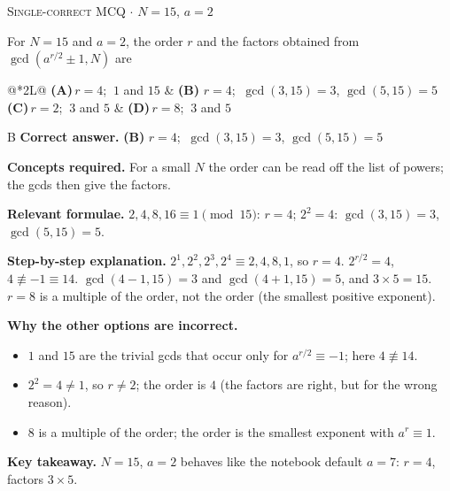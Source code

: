 \documentclass[11pt,a4paper]{article}
\newcommand{\optlabel}[1]{\textbf{(#1)}}
\newcommand{\correctlabel}[1]{\textcolor{okgreen}{\textbf{(#1)}\,\ding{51}}}
\newenvironment{qitem}[1]{\begin{list}{}{\setlength{\leftmargin}{3.3em}\setlength{\labelwidth}{3.1em}%
  \setlength{\labelsep}{0.2em}\setlength{\topsep}{3pt}\setlength{\parsep}{3pt}}\item[\textbf{Q.#1}\hfill]}{\end{list}}
\newcommand{\qsep}{\par\vspace{2pt}{\color{black!15}\hrule}\vspace{4pt}}
\newcommand{\qmeta}[2]{{\footnotesize\color{black!60}\textsc{#1} \;$\cdot$\; #2}\par}
\begin{document}
\begin{qitem}{42}
\qmeta{Single-correct MCQ}{$N = 15$, $a = 2$}
For $N = 15$ and $a = 2$, the order $r$ and the factors obtained from $\gcd(a^{r/2} \pm 1, N)$ are
\par\smallskip\noindent\begin{tabularx}{\linewidth}{@{}*{2}{L}@{}}
\optlabel{A}\,$r = 4$; $\ 1$ and $15$ & \correctlabel{B}\,$r = 4$; $\ \gcd(3, 15) = 3$, $\gcd(5, 15) = 5$ \\[3pt]
\optlabel{C}\,$r = 2$; $\ 3$ and $5$ & \optlabel{D}\,$r = 8$; $\ 3$ and $5$
\end{tabularx}
\end{qitem}
\begin{solbox}{B}
\textbf{\color{brand}Correct answer.} \textcolor{okgreen}{\textbf{(B)}} $r = 4$; $\ \gcd(3, 15) = 3$, $\gcd(5, 15) = 5$

\textbf{\color{brand}Concepts required.} For a small $N$ the order can be read off the list of powers; the gcds then give the factors.

\textbf{\color{brand}Relevant formulae.} $2, 4, 8, 16 \equiv 1 \pmod{15}$: $r = 4$; $2^2 = 4$: $\gcd(3, 15) = 3$, $\gcd(5, 15) = 5$.

\textbf{\color{brand}Step-by-step explanation.} $2^1, 2^2, 2^3, 2^4 \equiv 2, 4, 8, 1$, so $r = 4$. $2^{r/2} = 4$, $4 \not\equiv -1 \equiv 14$. $\gcd(4 - 1, 15) = 3$ and $\gcd(4 + 1, 15) = 5$, and $3\times5 = 15$.
$r = 8$ is a multiple of the order, not the order (the smallest positive exponent).

\textbf{\color{brand}Why the other options are incorrect.}
\begin{itemize}[leftmargin=2.4em, itemsep=1pt, topsep=2pt]
\item[\textbf{(A)}] $1$ and $15$ are the trivial gcds that occur only for $a^{r/2} \equiv -1$; here $4 \not\equiv 14$.
\item[\textbf{(C)}] $2^2 = 4 \ne 1$, so $r \ne 2$; the order is $4$ (the factors are right, but for the wrong reason).
\item[\textbf{(D)}] $8$ is a multiple of the order; the order is the smallest exponent with $a^r \equiv 1$.
\end{itemize}
\textbf{\color{brand}Key takeaway.} $N = 15$, $a = 2$ behaves like the notebook default $a = 7$: $r = 4$, factors $3 \times 5$.
\end{solbox}
\qsep
\end{document}
